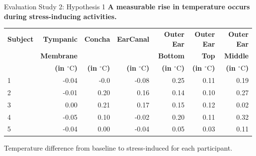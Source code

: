 \documentclass[en]{sdqbeamer}
\begin{document}
\begin{frame}{Evaluation Study 2: Hypothesis 1}
    \textbf{A measurable rise in temperature occurs during stress-inducing activities.}

    \begin{center}
        \begin{tabularx}{\textwidth}{|X|rrrrrr|}
        \hline
        \textbf{Subject} & \textbf{Tympanic} & \textbf{Concha} & \textbf{EarCanal} & \textbf{Outer Ear} & \textbf{Outer Ear} & \textbf{Outer Ear} \\
             & \textbf{Membrane} &  &  & \textbf{Bottom} & \textbf{Top} & \textbf{Middle} \\   
             &\textbf{(in \(^\circ\text{C}\))} & \textbf{(in \(^\circ\text{C}\))} & \textbf{(in \(^\circ\text{C}\))} & \textbf{(in \(^\circ\text{C}\))} & \textbf{(in \(^\circ\text{C}\))} & \textbf{(in \(^\circ\text{C}\))} \\
        \hline
        1 & -0.04 & -0.0 & -0.08 & 0.25 & 0.11 & 0.19 \\
        2 & -0.01 & 0.20 & 0.16 & 0.14 & 0.10 & 0.27 \\
        3 & 0.00 & 0.21 & 0.17 & 0.15 & 0.12 & 0.02 \\
        4 & -0.05 & 0.10 & -0.02 & 0.20 & 0.11 & 0.32 \\
        5 & -0.04 & 0.00 & -0.04 & 0.05 & 0.03 & 0.11 \\
        \hline
        \end{tabularx}
    \end{center}
    
    Temperature difference from baseline to stress-induced for each participant.
\end{frame}
\end{document}
